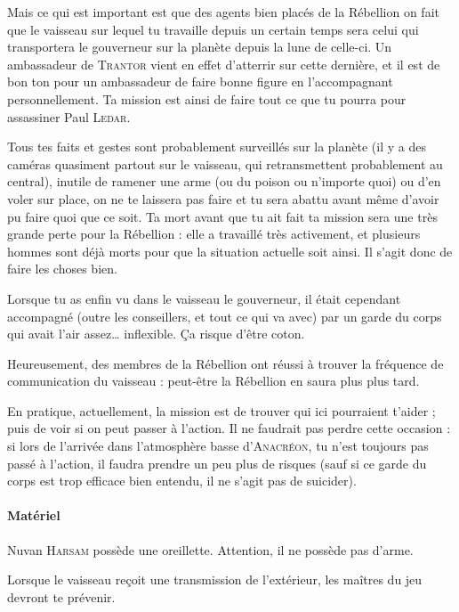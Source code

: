 \documentclass{article}
\begin{document}
{{Mais ce qui est important est que des agents bien placés de la Rébellion on fait que le vaisseau sur lequel tu travaille depuis un certain temps sera celui qui transportera le gouverneur sur la planète depuis la lune de celle-ci.
Un ambassadeur de \textsc{Trantor} vient en effet d’atterrir sur cette dernière, et il est de bon ton pour un ambassadeur de faire bonne figure en l’accompagnant personnellement.
Ta mission est ainsi de faire tout ce que tu pourra pour assassiner Paul \textsc{Ledar}.

Tous tes faits et gestes sont probablement surveillés sur la planète (il y a des caméras quasiment partout sur le vaisseau, qui retransmettent probablement au central), inutile de ramener une arme (ou du poison ou n’importe quoi) ou d’en voler sur place, on ne te laissera pas faire et tu sera abattu avant même d’avoir pu faire quoi que ce soit.
Ta mort avant que tu ait fait ta mission sera une très grande perte pour la Rébellion : elle a travaillé très activement, et plusieurs hommes sont déjà morts pour que la situation actuelle soit ainsi.
Il s’agit donc de faire les choses bien.

Lorsque tu as enfin vu dans le vaisseau le gouverneur, il était cependant accompagné (outre les conseillers, et tout ce qui va avec) par un garde du corps qui avait l’air assez… inflexible.
Ça risque d’être coton.

Heureusement, des membres de la Rébellion ont réussi à trouver la fréquence de communication du vaisseau : peut-être la Rébellion en saura plus plus tard.

En pratique, actuellement, la mission est de trouver qui ici pourraient t’aider ; puis de voir si on peut passer à l’action.
Il ne faudrait pas perdre cette occasion : si lors de l’arrivée dans l’atmosphère basse d’\textsc{Anacréon}, tu n’est toujours pas passé à l’action, il faudra prendre un peu plus de risques (sauf si ce garde du corps est trop efficace bien entendu, il ne s’agit pas de suicider).
}

\paragraph{Matériel}
{
Nuvan \textsc{Harsam} possède une oreillette.
Attention, il ne possède pas d’arme.

Lorsque le vaisseau reçoit une transmission de l’extérieur, les maîtres du jeu devront te prévenir.
}
}
\end{document}
